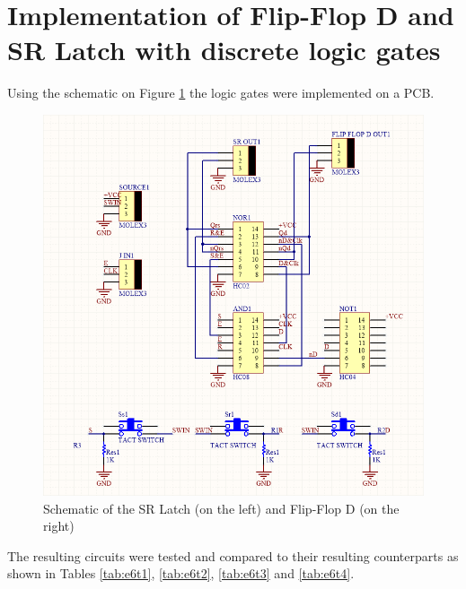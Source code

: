 \documentclass[a4paper]{article}
\begin{document}
        \section{Implementation of Flip-Flop D and SR Latch with discrete logic gates}
        Using the schematic on Figure \ref{fig:Schem} the logic gates were implemented on a PCB.
        
        \begin{figure}[h!]
            \begin{center}
                \includegraphics[width=\linewidth]{e6Schem.png}
                \caption{Schematic of the  SR Latch (on the left) and Flip-Flop D (on the right)}
            \end{center}
            \label{fig:Schem}
        \end{figure}

        The resulting circuits were tested and compared to their resulting counterparts as shown in
        Tables \ref{tab:e6t1}, \ref{tab:e6t2}, \ref{tab:e6t3} and \ref{tab:e6t4}.
\end{document}
